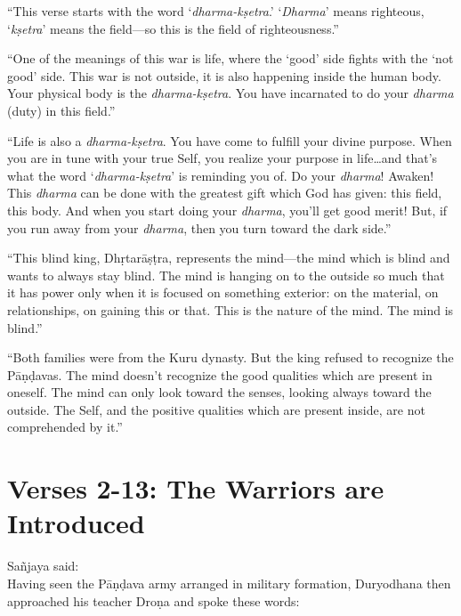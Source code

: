 \enquote{This verse starts with the word \enquote{\textit{dharma-kṣetra}.} \enquote{\textit{Dharma}} means righteous, \enquote{\textit{kṣetra}} means the field---so this is the field of righteousness.}

\enquote{One of the meanings of this war is life, where the \enquote{good} side fights with the \enquote{not good} side. This war is not outside, it is also happening inside the human body. Your physical body is the \textit{dharma-kṣetra}. You have incarnated to do your \textit{dharma} (duty) in this field.}

\enquote{Life is also a \textit{dharma-kṣetra}. You have come to fulfill your divine purpose. When you are in tune with your true Self, you realize your purpose in life\ldots and that’s what the word \enquote{\textit{dharma-kṣetra}} is reminding you of. Do your \textit{dharma}! Awaken! This \textit{dharma} can be done with the greatest gift which God has given: this field, this body. And when you start doing your \textit{dharma}, you’ll get good merit! But, if you run away from your \textit{dharma}, then you turn toward the dark side.}

\enquote{This blind king, Dhṛtarāṣṭra, represents the mind---the mind which is blind and wants to always stay blind. The mind is hanging on to the outside so much that it has power only when it is focused on something exterior: on the material, on relationships, on gaining this or that. This is the nature of the mind. The mind is blind.}

\enquote{Both families were from the Kuru dynasty. But the king refused to recognize the Pāṇḍavas. The mind doesn’t recognize the good qualities which are present in oneself. The mind can only look toward the senses, looking always toward the outside. The Self, and the positive qualities which are present inside, are not comprehended by it.}

\section{Verses 2-13: The Warriors are Introduced}\label{sec-verses-2-13-the-warriors-are-introduced}


{\hspace*{1em}Sañjaya said: \\
Having seen the Pāṇḍava army arranged in military formation, Duryodhana then approached his teacher Droṇa and spoke these words:}


